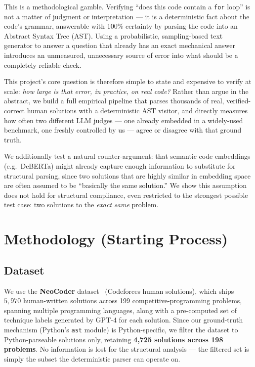\documentclass{article}
\begin{document}
This is a methodological gamble. Verifying ``does this code contain a
\texttt{for} loop'' is not a matter of judgment or interpretation --- it is a
deterministic fact about the code's grammar, answerable with 100\% certainty
by parsing the code into an Abstract Syntax Tree (AST). Using a probabilistic,
sampling-based text generator to answer a question that already has an exact
mechanical answer introduces an unmeasured, unnecessary source of error into
what should be a completely reliable check.

This project's core question is therefore simple to state and expensive to
verify at scale: \emph{how large is that error, in practice, on real code?}
Rather than argue in the abstract, we build a full empirical pipeline that
parses thousands of real, verified-correct human solutions with a
deterministic AST visitor, and directly measures how often two different LLM
judges --- one already embedded in a widely-used benchmark, one freshly
controlled by us --- agree or disagree with that ground truth.

We additionally test a natural counter-argument: that semantic code embeddings
(e.g.\ DeBERTa) might already capture enough information to substitute for
structural parsing, since two solutions that are highly similar in embedding
space are often assumed to be ``basically the same solution.'' We show this
assumption does not hold for structural compliance, even restricted to the
strongest possible test case: two solutions to the \emph{exact same} problem.

\section{Methodology (Starting Process)}

\subsection{Dataset}

We use the \textbf{NeoCoder} dataset~\citep{neocoder} (Codeforces human solutions), which
ships $5{,}970$ human-written solutions across 199 competitive-programming
problems, spanning multiple programming languages, along with a pre-computed
set of technique labels generated by GPT-4 for each solution. Since our
ground-truth mechanism (Python's \texttt{ast} module) is Python-specific, we
filter the dataset to Python-parseable solutions only, retaining
\textbf{4{,}725 solutions across 198 problems}. No information is lost for the
structural analysis --- the filtered set is simply the subset the
deterministic parser can operate on.
\end{document}
